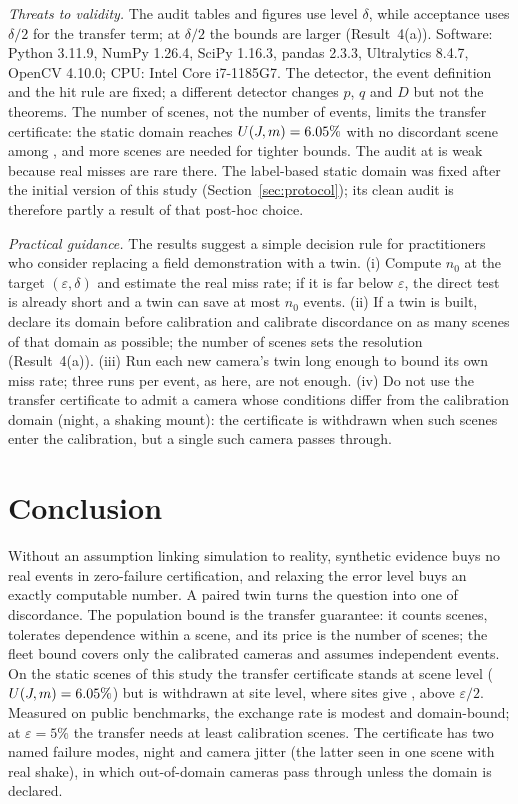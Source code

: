 \emph{Threats to validity.} The audit tables and figures use level $\delta$, while acceptance uses $\delta/2$ for the
transfer term; at $\delta/2$ the bounds are larger (Result~4(a)). Software: Python 3.11.9, NumPy 1.26.4, SciPy 1.16.3,
pandas 2.3.3, Ultralytics 8.4.7, OpenCV 4.10.0; CPU: Intel Core i7-1185G7. The detector, the event definition and the
hit rule are fixed; a different detector changes
$p$, $q$ and $D$ but not the theorems. The number of scenes, not the number of events, limits the transfer certificate:
the static domain reaches $U(J,m)=6.05\%$ with no discordant scene among \nMainM, and more scenes are needed for
tighter bounds. The audit at \OPs{} is weak because real misses are rare there. The label-based static domain was fixed after the initial version of this
study (Section~\ref{sec:protocol}); its clean audit is therefore partly a result of that post-hoc choice.

\emph{Practical guidance.} The results suggest a simple decision rule for practitioners who consider replacing a
field demonstration with a twin. (i) Compute $n_0$ at the target $(\varepsilon,\delta)$ and estimate the real miss rate;
if it is far below $\varepsilon$, the direct test is already short and a twin can save at most $n_0$ events. (ii) If a
twin is built, declare its domain before calibration and calibrate discordance on as many scenes of that domain as
possible; the number of scenes sets the resolution (Result~4(a)). (iii) Run each new camera's twin long
enough to bound its own miss rate; three runs per event, as here, are not enough. (iv) Do not use the transfer
certificate to admit a camera whose conditions differ from the calibration domain (night, a shaking mount): the
certificate is withdrawn when such scenes enter the calibration, but a single such camera passes through.

\section{Conclusion}\label{sec:conclusion}
Without an assumption linking simulation to reality, synthetic evidence buys no real events in zero-failure
certification, and relaxing the error level buys an exactly computable number. A paired twin turns the question into
one of discordance. The population bound is the transfer guarantee: it counts scenes, tolerates dependence within a
scene, and its price is the number of scenes; the fleet bound covers only the calibrated cameras and assumes independent
events. On the \nMainScenes{} static scenes of this study the transfer certificate stands at scene level
($U(J,m)=6.05\%$) but is withdrawn at site level, where \nSiteSm{} sites give \nSiteSU, above $\varepsilon/2$.
Measured on public benchmarks, the exchange rate is modest and domain-bound; at $\varepsilon=5\%$ the transfer needs at
least \nPopScenesQuarter{} calibration scenes. The certificate has two named failure modes, night and camera jitter
(the latter seen in one scene with real shake), in which out-of-domain cameras pass through unless the domain is
declared.
